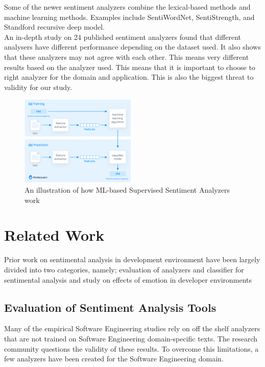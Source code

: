 \documentclass[conference]{IEEEtran}
\begin{document}
Some of the newer sentiment analyzers combine the lexical-based methods and machine learning methods. Examples include SentiWordNet\cite{b15}, SentiStrength\cite{b16}, and Standford recursive deep model\cite{b17}.\\

An in-depth study on 24 published sentiment analyzers found that different analysers have different performance depending on the dataset used. It also shows that these analyzers may not agree with each other. This means very different results based on the analyzer used. This means that it is important to choose to right analyzer for the domain and application. This is also the biggest threat to validity for our study.\\

\begin{figure}[htbp]
\centerline{\includegraphics[width=0.49\textwidth]{how-does-sentiment-analysis-work.png}}
\caption{An illustration of how ML-based Supervised Sentiment Analyzers work\cite{b32}}
\label{fig}
\end{figure}

\section{Related Work}
Prior work on sentimental analysis in development environment have been largely divided into two categories, namely; evaluation of analyzers and classifier for sentimental analysis and study on effects of emotion in developer environments\\


\subsection{Evaluation of Sentiment Analysis Tools}
Many of the empirical Software Engineering studies rely on off the shelf analyzers that are not trained on Software Engineering domain-specific texts. The research community questions the validity of these results\cite{b21}. To overcome this limitations, a few analyzers have been created for the Software Engineering domain.\\ 
\end{document}
